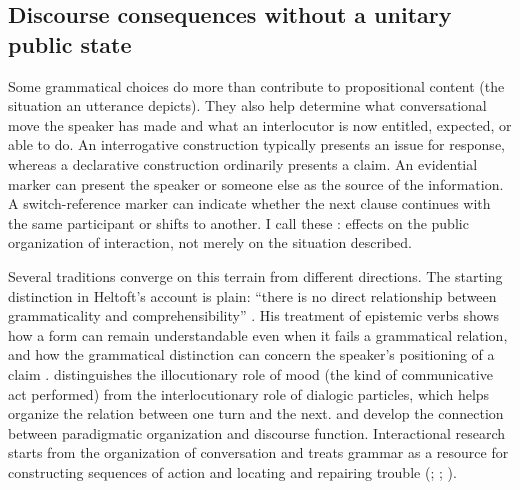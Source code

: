 \documentclass[12pt,letterpaper]{article}
\begin{document}
\subsection{Discourse consequences without a unitary public state}
\label{sec:discourse}

Some grammatical choices do more than contribute to propositional content (the
situation an utterance depicts). They also help determine what conversational
move the speaker has made and what an interlocutor is now entitled, expected, or
able to do. An interrogative construction typically presents an issue for response, whereas
a declarative construction ordinarily presents a claim. An evidential marker can
present the speaker or someone else as the source of the information. A
switch-reference marker can indicate whether the next clause
continues with the same participant or shifts to another. I call these
: effects on the public organization of interaction,
not merely on the situation described.

Several traditions converge on this terrain from different directions. The
starting distinction in Heltoft's account is plain: \enquote{there is no direct
relationship between grammaticality and comprehensibility}
\citep[95]{heltoft1981intersubjectivity}. His treatment of epistemic verbs shows
how a form can remain understandable even when it fails a grammatical relation,
and how the grammatical distinction can concern the speaker's positioning of a claim
\citep[99--104]{heltoft1981intersubjectivity}.
\textcite[81--82, 92--98]{heltoft2005modality} distinguishes the illocutionary role of mood (the
kind of communicative act performed) from the interlocutionary role of dialogic
particles, which helps organize the relation between one turn and the next.
\textcite[vol.~1, 43--80, 142--149]{hansenheltoft2011gds} and
\textcite[77--84, 104--106]{jakobsenheltoft2012paradigm}
develop the connection between paradigmatic organization and discourse function.
Interactional research starts from the organization of conversation and treats
grammar as a resource for constructing sequences of action and locating and
repairing trouble
(\citealp[185--190, 231--237]{foxetal1996repair};
\citealp[99--103, 123--124]{muntiglventola2010};
\citealp[5--10]{dingemanseblythedirksmeyer2014}).
\end{document}
